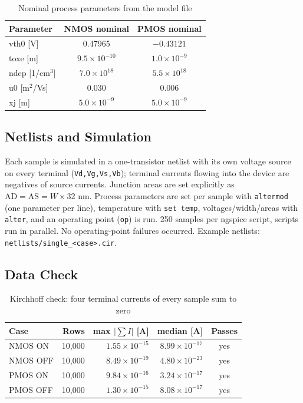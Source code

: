 \documentclass[11pt,a4paper]{article}
\begin{document}
\begin{table}[H]\centering\small
\caption{Nominal process parameters from the model file}
\begin{tabular}{lcc}\toprule
Parameter & NMOS nominal & PMOS nominal\\\midrule
vth0 [V] & 0.47965 & $-0.43121$\\
toxe [m] & $9.5\times10^{-10}$ & $1.0\times10^{-9}$\\
ndep [1/cm$^3$] & $7.0\times10^{18}$ & $5.5\times10^{18}$\\
u0 [m$^2$/Vs] & 0.030 & 0.006\\
xj [m] & $5.0\times10^{-9}$ & $5.0\times10^{-9}$\\
\bottomrule\end{tabular}\end{table}

\subsection{Netlists and Simulation}
Each sample is simulated in a one-transistor netlist with its own voltage source on every terminal (\texttt{Vd,Vg,Vs,Vb}); terminal currents flowing into the device are negatives of source currents. Junction areas are set explicitly as $\mathrm{AD}=\mathrm{AS}=W\times 32$ nm. Process parameters are set per sample with \texttt{altermod} (one parameter per line), temperature with \texttt{set temp}, voltages/width/areas with \texttt{alter}, and an operating point (\texttt{op}) is run. 250 samples per ngspice script, scripts run in parallel. No operating-point failures occurred. Example netlists: \texttt{netlists/single\_<case>.cir}.

\subsection{Data Check}
\begin{table}[H]\centering\small
\caption{Kirchhoff check: four terminal currents of every sample sum to zero}
\begin{tabular}{lrrrc}\toprule
Case & Rows & max $|\sum I|$ [A] & median [A] & Passes\\\midrule
NMOS ON & 10{,}000 & $1.55\times10^{-15}$ & $8.99\times10^{-17}$ & yes\\
NMOS OFF & 10{,}000 & $8.49\times10^{-19}$ & $4.80\times10^{-23}$ & yes\\
PMOS ON & 10{,}000 & $9.84\times10^{-16}$ & $3.24\times10^{-17}$ & yes\\
PMOS OFF & 10{,}000 & $1.30\times10^{-15}$ & $8.08\times10^{-17}$ & yes\\
\bottomrule\end{tabular}\end{table}
\end{document}
